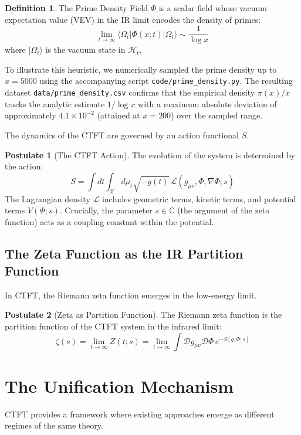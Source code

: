 \documentclass[11pt, a4paper]{article}
\theoremstyle{definition}
\newtheorem{definition}{Definition}[section]
\newtheorem{postulate}{Postulate}
\newcommand{\C}{\mathbb{C}}
\newcommand{\CTS}{\mathcal{X}}
\newcommand{\Lagr}{\mathcal{L}}
\newcommand{\Hilb}{\mathcal{H}}
\begin{document}
\begin{definition}
The Prime Density Field $\Phi$ is a scalar field whose vacuum expectation value (VEV) in the IR limit encodes the density of primes:
$$ \lim_{t\to\infty} \langle \Omega_t | \Phi(x; t) | \Omega_t \rangle \sim \frac{1}{\log x} $$
where $|\Omega_t\rangle$ is the vacuum state in $\Hilb_t$.
\end{definition}

    To illustrate this heuristic, we numerically sampled the prime density up to $x=5000$ using the accompanying script \texttt{code/prime\_density.py}. The resulting dataset \texttt{data/prime\_density.csv} confirms that the empirical density $\pi(x)/x$ tracks the analytic estimate $1/\log x$ with a maximum absolute deviation of approximately $4.1\times 10^{-2}$ (attained at $x=200$) over the sampled range.

The dynamics of the CTFT are governed by an action functional $S$.

\begin{postulate}[The CTFT Action]
The evolution of the system is determined by the action:
$$ S = \int dt \int_{\CTS} d\mu_t \sqrt{-g(t)} \, \Lagr(g_{\mu\nu}, \Phi, \nabla\Phi; s) $$
The Lagrangian density $\Lagr$ includes geometric terms, kinetic terms, and potential terms $V(\Phi; s)$. Crucially, the parameter $s \in \C$ (the argument of the zeta function) acts as a coupling constant within the potential.
\end{postulate}

\subsection{The Zeta Function as the IR Partition Function}
In CTFT, the Riemann zeta function emerges in the low-energy limit.

\begin{postulate}[Zeta as Partition Function]
The Riemann zeta function is the partition function of the CTFT system in the infrared limit:
$$ \zeta(s) = \lim_{t\to\infty} Z(t; s) = \lim_{t\to\infty} \int \mathcal{D}g_{\mu\nu} \mathcal{D}\Phi \, e^{-S[g, \Phi; s]} $$
\end{postulate}

\section{The Unification Mechanism}
CTFT provides a framework where existing approaches emerge as different regimes of the same theory.
\end{document}
